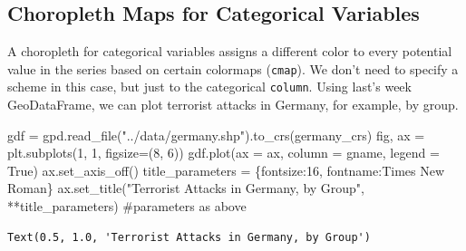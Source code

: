 \documentclass[
  letterpaper,
  DIV=11,
  numbers=noendperiod]{scrreprt}
\newenvironment{Shaded}{\begin{snugshade}}{\end{snugshade}}
\newcommand{\CommentTok}[1]{\textcolor[rgb]{0.37,0.37,0.37}{#1}}
\newcommand{\DecValTok}[1]{\textcolor[rgb]{0.68,0.00,0.00}{#1}}
\newcommand{\NormalTok}[1]{\textcolor[rgb]{0.00,0.23,0.31}{#1}}
\newcommand{\OperatorTok}[1]{\textcolor[rgb]{0.37,0.37,0.37}{#1}}
\newcommand{\StringTok}[1]{\textcolor[rgb]{0.13,0.47,0.30}{#1}}
\newcommand{\VariableTok}[1]{\textcolor[rgb]{0.07,0.07,0.07}{#1}}
\begin{document}
\subsection{Choropleth Maps for Categorical
Variables}\label{choropleth-maps-for-categorical-variables}

A choropleth for categorical variables assigns a different color to
every potential value in the series based on certain colormaps
(\texttt{cmap}). We don't need to specify a scheme in this case, but
just to the categorical \texttt{column}. Using last's week GeoDataFrame,
we can plot terrorist attacks in Germany, for example, by group.

\begin{Shaded}
\begin{Highlighting}[]
\NormalTok{gdf }\OperatorTok{=}\NormalTok{ gpd.read\_file(}\StringTok{"../data/germany.shp"}\NormalTok{).to\_crs(germany\_crs)}
\NormalTok{fig, ax }\OperatorTok{=}\NormalTok{ plt.subplots(}\DecValTok{1}\NormalTok{, }\DecValTok{1}\NormalTok{, figsize}\OperatorTok{=}\NormalTok{(}\DecValTok{8}\NormalTok{, }\DecValTok{6}\NormalTok{))}
\NormalTok{gdf.plot(ax }\OperatorTok{=}\NormalTok{ ax, column }\OperatorTok{=} \StringTok{\textquotesingle{}gname\textquotesingle{}}\NormalTok{, legend }\OperatorTok{=} \VariableTok{True}\NormalTok{)}
\NormalTok{ax.set\_axis\_off()}
\NormalTok{title\_parameters }\OperatorTok{=}\NormalTok{ \{}\StringTok{\textquotesingle{}fontsize\textquotesingle{}}\NormalTok{:}\StringTok{\textquotesingle{}16\textquotesingle{}}\NormalTok{, }\StringTok{\textquotesingle{}fontname\textquotesingle{}}\NormalTok{:}\StringTok{\textquotesingle{}Times New Roman\textquotesingle{}}\NormalTok{\}}
\NormalTok{ax.set\_title(}\StringTok{"Terrorist Attacks in Germany, by Group"}\NormalTok{, }\OperatorTok{**}\NormalTok{title\_parameters) }\CommentTok{\#parameters as above}
\end{Highlighting}
\end{Shaded}

\begin{verbatim}
Text(0.5, 1.0, 'Terrorist Attacks in Germany, by Group')
\end{verbatim}
\end{document}
